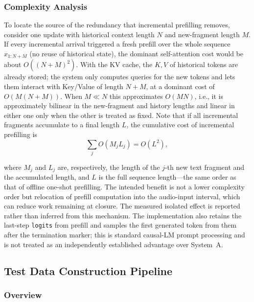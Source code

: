 \documentclass[conference]{IEEEtran}
\begin{document}
\subsubsection{Complexity Analysis}

To locate the source of the redundancy that incremental prefilling removes, consider one update with historical context length $N$ and new-fragment length $M$. If every incremental arrival triggered a fresh prefill over the whole sequence $x_{1:N+M}$ (no reuse of historical state), the dominant self-attention cost would be about $O\!\left((N+M)^{2}\right)$. With the KV cache, the $K,V$ of historical tokens are already stored; the system only computes queries for the new tokens and lets them interact with Key/Value of length $N+M$, at a dominant cost of $O\!\left(M(N+M)\right)$. When $M\ll N$ this approximates $O(MN)$, i.e., it is approximately bilinear in the new-fragment and history lengths and linear in either one only when the other is treated as fixed. Note that if all incremental fragments accumulate to a final length $L$, the cumulative cost of incremental prefilling is
\begin{equation}
\sum_{j}O\!\left(M_j L_j\right)=O\!\left(L^{2}\right),
\label{eq:cumcost}
\end{equation}

where $M_j$ and $L_j$ are, respectively, the length of the $j$-th new text fragment and the accumulated length, and $L$ is the full sequence length---the same order as that of offline one-shot prefilling. The intended benefit is not a lower complexity order but relocation of prefill computation into the audio-input interval, which can reduce work remaining at closure. The measured isolated effect is reported rather than inferred from this mechanism. The implementation also retains the last-step \texttt{logits} from prefill and samples the first generated token from them after the termination marker; this is standard causal-LM prompt processing and is not treated as an independently established advantage over System~A.

\subsection{Test Data Construction Pipeline}\label{sec:data}

\subsubsection{Overview}
\end{document}
